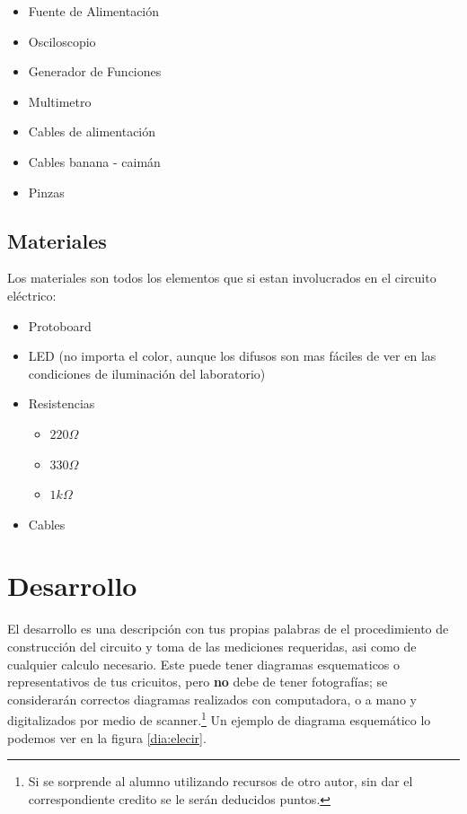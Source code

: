 	\begin{itemize}
		\item Fuente de Alimentación
		\item Osciloscopio
		\item Generador de Funciones
		\item Multimetro
		\item Cables de alimentación
		\item Cables banana - caimán
		\item Pinzas
	\end{itemize}


\subsection{Materiales}

	Los materiales son todos los elementos que si estan involucrados en el circuito eléctrico:

	\begin{itemize}
		\item Protoboard
		\item LED (no importa el color, aunque los difusos son mas fáciles de ver en las condiciones de iluminación del laboratorio)
		\item Resistencias
		\begin{itemize}
			\item $220 \Omega$
			\item $330 \Omega$
			\item $1 k\Omega$
		\end{itemize}
		\item Cables
	\end{itemize}


\section{Desarrollo}

    El desarrollo es una descripción con tus propias palabras de el procedimiento de construcción del circuito y toma de las mediciones requeridas, asi como de cualquier calculo necesario. Este puede tener diagramas esquematicos o representativos de tus cricuitos, pero \textbf{no} debe de tener fotografías; se considerarán correctos diagramas realizados con computadora, o a mano y digitalizados por medio de scanner.\footnote{Si se sorprende al alumno utilizando recursos de otro autor, sin dar el correspondiente credito se le serán deducidos puntos.} Un ejemplo de diagrama esquemático lo podemos ver en la figura \ref{dia:elecir}. \\

